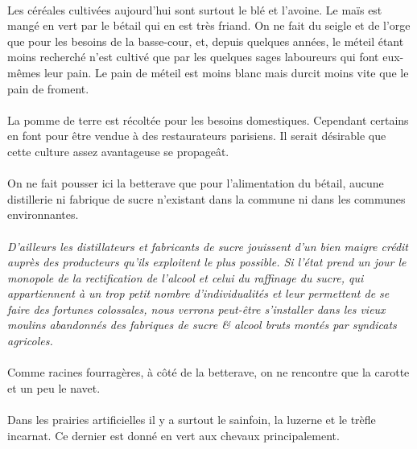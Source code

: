 \documentclass[../eBook.tex]{subfiles}
\begin{document}
    \paragraph{}Les céréales cultivées aujourd'hui sont surtout le blé et l'avoine. Le maïs est mangé en vert par le bétail qui en est très friand. On ne fait du seigle et de l'orge que pour les besoins de la basse-cour, et, depuis quelques années, le  méteil étant moins recherché n'est cultivé que par les quelques sages laboureurs qui font eux-mêmes leur pain. Le pain de méteil est moins blanc mais durcit moins vite que le pain de froment.
    \paragraph{}La pomme de terre est récoltée pour les besoins domestiques. Cependant certains en font pour être vendue à des restaurateurs parisiens. Il serait désirable que cette culture assez avantageuse se propageât.
    \paragraph{}On ne fait pousser ici la betterave que pour l'alimentation du bétail, aucune distillerie ni fabrique de sucre n'existant dans la commune ni dans les communes environnantes.
    \paragraph{}\textit{D'ailleurs les distillateurs et fabricants de sucre jouissent d'un bien maigre crédit auprès des producteurs qu'ils exploitent le plus possible. Si l'état prend un jour le monopole de la rectification de l'alcool et celui du raffinage du sucre, qui appartiennent à un trop petit nombre d'individualités et leur permettent de se faire des fortunes colossales, nous verrons peut-être s'installer dans les vieux moulins abandonnés des fabriques de sucre \& alcool bruts montés par syndicats agricoles.}
    \paragraph{}Comme racines fourragères, à côté de la betterave, on ne rencontre que la carotte et un peu le navet.
    \paragraph{}Dans les prairies artificielles il y a surtout le sainfoin, la luzerne et le trèfle incarnat. Ce dernier est donné en vert aux chevaux principalement.
\end{document}
